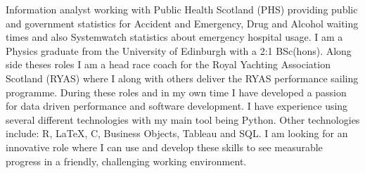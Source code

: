 

\begin{cvparagraph}
Information analyst working with Public Health Scotland (PHS) providing public and government statistics for Accident and Emergency, Drug and Alcohol waiting times and also Systemwatch statistics about emergency hospital usage. I am a Physics graduate from the University of Edinburgh with a 2:1 BSc(hons). Along side theses roles I am a head race coach for the Royal Yachting Association Scotland (RYAS) where I along with others deliver the RYAS performance sailing programme. During these roles and in my own time I have developed a passion for data driven performance and software development. I have experience using several different technologies with my main tool being Python. Other technologies include: R, LaTeX, C, Business Objects, Tableau and SQL. I am looking for an innovative role where I can use and develop these skills to see measurable progress in a friendly, challenging working environment.

\end{cvparagraph}
